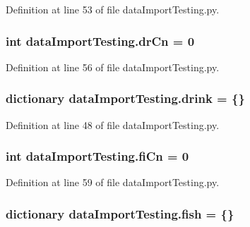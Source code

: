 Definition at line 53 of file data\-Import\-Testing.\-py.

\hypertarget{namespacedataImportTesting_a9dcd754b628562646578f53260ef21b3}{
\subsubsection[{dr\-Cn}]{\setlength{\rightskip}{0pt plus 5cm}int data\-Import\-Testing.\-dr\-Cn = 0}}\label{namespacedataImportTesting_a9dcd754b628562646578f53260ef21b3}


Definition at line 56 of file data\-Import\-Testing.\-py.

\hypertarget{namespacedataImportTesting_ad91970fb7d7fd60f4fe54adbfb7e6a4b}{
\subsubsection[{drink}]{\setlength{\rightskip}{0pt plus 5cm}dictionary data\-Import\-Testing.\-drink = \{\}}}\label{namespacedataImportTesting_ad91970fb7d7fd60f4fe54adbfb7e6a4b}


Definition at line 48 of file data\-Import\-Testing.\-py.

\hypertarget{namespacedataImportTesting_a29ff5fc73f80b04dee9840edd4480bb8}{
\subsubsection[{fi\-Cn}]{\setlength{\rightskip}{0pt plus 5cm}int data\-Import\-Testing.\-fi\-Cn = 0}}\label{namespacedataImportTesting_a29ff5fc73f80b04dee9840edd4480bb8}


Definition at line 59 of file data\-Import\-Testing.\-py.

\hypertarget{namespacedataImportTesting_ad4143a6d82f48166af50a5d847d61016}{
\subsubsection[{fish}]{\setlength{\rightskip}{0pt plus 5cm}dictionary data\-Import\-Testing.\-fish = \{\}}}\label{namespacedataImportTesting_ad4143a6d82f48166af50a5d847d61016}


